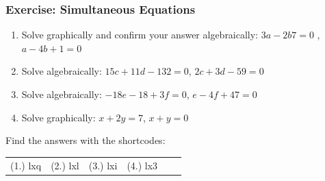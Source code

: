     \noindent
  
\label{m39257*secfhsst!!!underscore!!!id5809}
            \subsubsection{ Exercise: Simultaneous Equations }
            \nopagebreak
            
        \label{m39257*id161286}\begin{enumerate}[noitemsep, label=\textbf{\arabic*}. ] 
            \label{m39257*uid98}\item Solve graphically and confirm your answer algebraically:
\begin{math}3a-2b7=0\end{math} , \begin{math}a-4b+1=0\end{math}\hspace{1ex}        
\label{m39257*uid99}\item Solve algebraically: \begin{math}15c+11d-132=0\end{math}, \begin{math}2c+3d-59=0\end{math}\hspace{1ex}        
\label{m39257*uid100}\item Solve algebraically: \begin{math}-18e-18+3f=0\end{math}, \begin{math}e-4f+47=0\end{math}\hspace{1ex}        
\label{m39257*uid101}\item Solve graphically: \begin{math}x+2y=7\end{math}, \begin{math}x+y=0\end{math}\hspace{1ex}        
\end{enumerate}
        
        

      
    
\label{m39257**end}
          
\par {} Find the answers with the shortcodes:
 \par \begin{tabular}[h]{cccccc}
 (1.) lxq  &  (2.) lxl  &  (3.) lxi  &  (4.) lx3  & \end{tabular}

